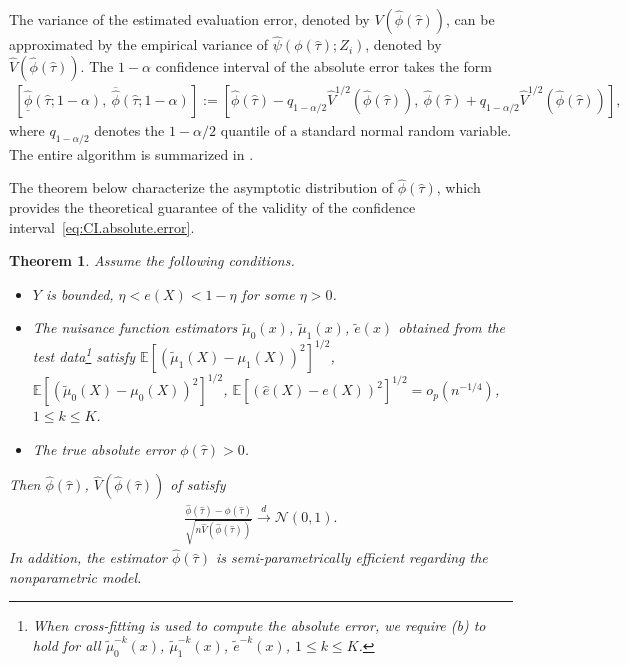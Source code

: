 \documentclass{article}
\theoremstyle{plain}
\newtheorem{theorem}{Theorem}[section]
\theoremstyle{definition}
\def\EE{\mathbb{E}}
\def\calN{\mathcal{N}}
\theoremstyle{plain}
\begin{document}
The variance of the estimated evaluation error, denoted by ${V}(\hat{\phi}(\hat{\tau}))$, can be approximated by the empirical variance of $\hat{\psi}(\phi(\hat{\tau}); Z_i)$, denoted by $\hat{V}(\hat{\phi}(\hat{\tau}))$.
The $1-\alpha$ confidence interval of the absolute error takes the form 
\begin{align}\label{eq:CI.absolute.error}
    [\underline{\hat{\phi}}(\hat{\tau}; 1-\alpha), ~\overline{\hat{\phi}}(\hat{\tau}; 1-\alpha)]:= \left[\hat{\phi}(\hat{\tau}) - q_{1-\alpha/2} \hat{V}^{1/2}(\hat{\phi}(\hat{\tau})), ~\hat{\phi}(\hat{\tau}) + q_{1-\alpha/2} \hat{V}^{1/2}(\hat{\phi}(\hat{\tau}))\right],
\end{align} 
where $q_{1-\alpha/2}$ denotes the $1-\alpha/2$ quantile of a standard normal random variable.
The entire algorithm is summarized in .


The theorem below characterize the asymptotic distribution of $\hat{\phi}(\hat{\tau})$, which provides the theoretical guarantee of the validity of the confidence interval~\eqref{eq:CI.absolute.error}.
\begin{theorem}\label{theo:absolute.error}
    Assume the following conditions.
    \begin{itemize}
        \item [(a)] $Y$ is bounded, $\eta < e(X) < 1 - \eta$ for some $\eta > 0$.
        \item [(b)] The nuisance function estimators $\tilde{\mu}_{0}(x)$, $\tilde{\mu}_{1}(x)$, $\tilde{e}(x)$ obtained from the test data\footnote{When cross-fitting is used to compute the absolute error, we require (b) to hold for all $\tilde{\mu}_{0}^{-k}(x)$, $\tilde{\mu}_{1}^{-k}(x)$, $\tilde{e}^{-k}(x)$, $1 \le k \le K$.} satisfy $\EE[(\tilde{\mu}_{1}(X) - \mu_1(X))^2]^{1/2}$, $\EE[(\tilde{\mu}_{0}(X) - \mu_0(X))^2]^{1/2}$, $\EE[(\hat{e}(X) - e(X))^2]^{1/2} = o_p(n^{-1/4})$, $1 \le k \le K$. 
        \item [(c)] The true absolute error $\phi(\hat{\tau}) > 0$.
    \end{itemize}
    Then $\hat{\phi}(\hat{\tau})$, $\hat{V} (\hat{\phi}(\hat{\tau}))$ of  satisfy
    \begin{align*}
        \frac{\hat{\phi}(\hat{\tau}) - {\phi}(\hat{\tau})}{\sqrt{n\hat{V}(\hat{\phi}(\hat{\tau}))}}
        \stackrel{d}{\to} \calN(0,1).
    \end{align*}
    In addition, the estimator $\hat{\phi}(\hat{\tau})$ is semi-parametrically efficient regarding the nonparametric model.
\end{theorem}
\end{document}
